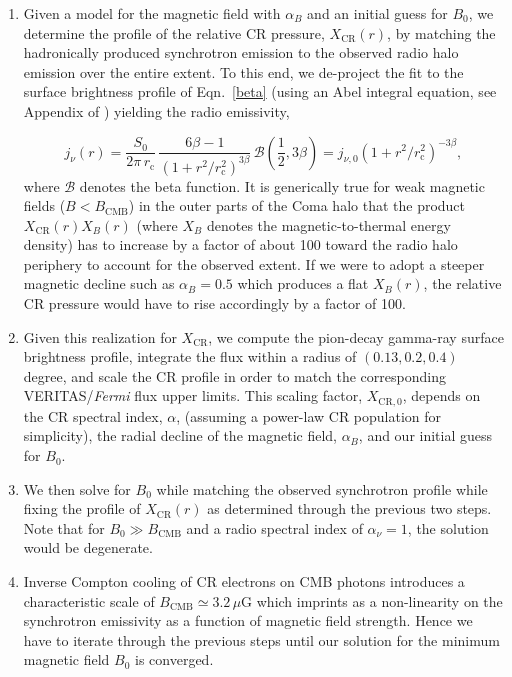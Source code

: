 \documentclass[12pt,manuscript]{aastex}
\newcommand{\rmn}{\mathrm}
\newcommand{\CR}{\mathrm{CR}}
\begin{document}
\begin{enumerate}
\item
Given a model for the magnetic field with $\alpha_B$ and an initial guess for $B_0$, we determine
the profile of the relative CR pressure, $X_{\CR}(r)$, by matching the hadronically produced
synchrotron emission to the observed radio halo emission over the entire extent. To 
this end, we de-project the fit to the surface brightness profile of Eqn.~\ref{beta} (using an Abel
integral equation, see Appendix of \citealt{article:PfrommerEnsslin:2004b}) yielding the radio
emissivity,

\begin{equation}
\label{eq:Coma:radio}
j_{\nu} (r) = \frac{S_{0}}{2\pi\, r_{\rmn{c}}}\,
\frac{6\beta - 1}{\left(1 + r^{2}/r_{\rmn{c}}^{2}\right)^{3 \beta}}\,
\mathcal{B}\left(\frac{1}{2}, 3\beta\right)
= j_{\nu,0} \left(1 + r^2/r_{\rmn{c}}^{2}\right)^{-3 \beta},
\end{equation}
where $\mathcal{B}$ denotes the beta function. It is generically true for weak magnetic fields
($B<B_{\rmn{CMB}}$) in the outer parts of the Coma halo that the product $X_{\CR}(r)X_{B}(r)$
(where $X_B$ denotes the magnetic-to-thermal energy density) has to increase by a factor of about
100 toward the radio halo periphery to account for the observed extent. If we were to adopt a
steeper magnetic decline such as $\alpha_{B}=0.5$ which produces a flat $X_{B}(r)$, the relative CR
pressure would have to rise accordingly by a factor of 100.

\item
Given this realization for $X_{\CR}$, we compute the pion-decay gamma-ray surface brightness
profile, integrate the flux within a radius of $(0.13, 0.2, 0.4)$ degree, and scale the CR profile
in order to match the corresponding VERITAS/{\em Fermi} flux upper limits. This scaling factor,
$X_{\CR,0}$, depends on the CR spectral index, $\alpha$, (assuming a power-law CR population for
simplicity), the radial decline of the magnetic field, $\alpha_{B}$, and our initial guess for
$B_{0}$.

\item
We then solve for $B_{0}$ while matching the observed synchrotron profile while fixing the profile
of $X_{\CR}(r)$ as determined through the previous two steps. Note
that for $B_{0} \gg B_{\rmn{CMB}}$ and a radio spectral index of $\alpha_{\nu}=1$, the solution
would be degenerate.

\item
Inverse Compton cooling of CR electrons on CMB photons introduces a characteristic scale of
$B_{\rmn{CMB}}\simeq 3.2\,\mu$G which imprints as a non-linearity on the synchrotron emissivity as a
function of magnetic field strength. Hence we have to iterate through the previous steps until our
solution for the minimum magnetic field $B_{0}$ is converged.
\end{enumerate}
\end{document}

